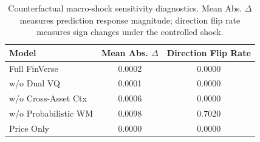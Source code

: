 \begin{table}[t]
\centering
\caption{Counterfactual macro-shock sensitivity diagnostics. Mean Abs. $\Delta$ measures prediction response magnitude; direction flip rate measures sign changes under the controlled shock.}
\label{tab:counterfactual_sensitivity}
\begin{tabular}{lcc}
\toprule
Model & Mean Abs. $\Delta$ & Direction Flip Rate \\
\midrule
Full FinVerse & 0.0002 & 0.0000 \\
w/o Dual VQ & 0.0001 & 0.0000 \\
w/o Cross-Asset Ctx & 0.0006 & 0.0000 \\
w/o Probabilistic WM & 0.0098 & 0.7020 \\
Price Only & 0.0000 & 0.0000 \\
\bottomrule
\end{tabular}
\end{table}

